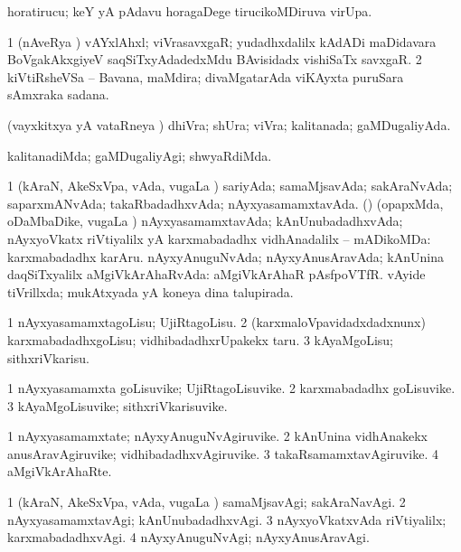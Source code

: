 \bentry
{} 
\gl{\nA}
\expl{}
\bmng
 horatirucu; keY yA pAdavu horagaDege tirucikoMDiruva virUpa. 
\emng
\eentry

\bentry
{} 
\gl{\nA}
\expl{}
\bmng
\bnum
\num{1} (nAveRya \pu) vAYxlAhxl; viVrasavxgaR; yudadhxdalilx kAdADi maDidavara BoVgakAkxgiyeV saqSiTxyAdadedxMdu BAvisidadx vishiSaTx savxgaR. 
\num{2} kiVtiRsheVSa -- Bavana, maMdira; divaMgatarAda viKAyxta puruSara sAmxraka sadana. 
\enum
\emng
\eentry

\bentry
{} 
\gl{\gu}
\expl{}
\bmng
 (vayxkitxya yA vataRneya \vi) dhiVra; shUra; viVra; kalitanada; gaMDugaliyAda. 
\emng
\eentry

\bentry
{} 
\gl{\kirxvi}
\expl{}
\bmng
 kalitanadiMda; gaMDugaliyAgi; shwyaRdiMda. 
\emng
\eentry

\bentry
{} 
\gl{\gu}
\expl{}
\bmng
\bnum
\num{1} (kAraN, AkeSxVpa, vAda, \mo vugaLa \vi) sariyAda; samaMjsavAda; sakAraNvAda; saparxmANvAda; takaRbadadhxvAda; nAyxyasamamxtavAda. 
 (\nAyxshA) (opapxMda, oDaMbaDike, \mo vugaLa \vi) nAyxyasamamxtavAda; kAnUnubadadhxvAda; nAyxyoVkatx riVtiyalilx yA karxmabadadhx vidhAnadalilx -- mADikoMDa: 
\banum
{}  karxmabadadhx karAru. 
 nAyxyAnuguNvAda; nAyxyAnusAravAda; kAnUnina daqSiTxyalilx aMgiVkArAhaRvAda:  aMgiVkArAhaR pAsfpoVTfR. 
 vAyide tiVrillxda; mukAtxyada yA koneya dina talupirada. 
\eanum
\numie
\enum
\emng
\eentry

\bentry
{} 
\gl{\sakirx}
\expl{}
\bmng
\bnum
\num{1} nAyxyasamamxtagoLisu; UjiRtagoLisu. 
\num{2} (karxmaloVpavidadxdadxnunx) karxmabadadhxgoLisu; vidhibadadhxrUpakekx taru. 
\num{3} kAyaMgoLisu; sithxriVkarisu. 
\enum
\emng
\eentry

\bentry
{} 
\gl{\nA}
\expl{}
\bmng
\bnum
\num{1} nAyxyasamamxta goLisuvike; UjiRtagoLisuvike. 
\num{2} karxmabadadhx goLisuvike. 
\num{3} kAyaMgoLisuvike; sithxriVkarisuvike. 
\enum
\emng
\eentry

\bentry
{} 
\gl{\nA}
\expl{}
\bmng
\bnum
\num{1} nAyxyasamamxtate; nAyxyAnuguNvAgiruvike. 
\num{2} kAnUnina vidhAnakekx anusAravAgiruvike; vidhibadadhxvAgiruvike. 
\num{3} takaRsamamxtavAgiruvike. 
\num{4} aMgiVkArAhaRte. 
\enum
\emng
\eentry

\bentry
{} 
\gl{\kirxvi}
\expl{}
\bmng
\bnum
\num{1} (kAraN, AkeSxVpa, vAda, \mo vugaLa \vi) samaMjsavAgi; sakAraNavAgi. 
\num{2} nAyxyasamamxtavAgi; kAnUnubadadhxvAgi. 
\num{3} nAyxyoVkatxvAda riVtiyalilx; karxmabadadhxvAgi. 
\num{4} nAyxyAnuguNvAgi; nAyxyAnusAravAgi. 
\enum
\emng
\eentry

